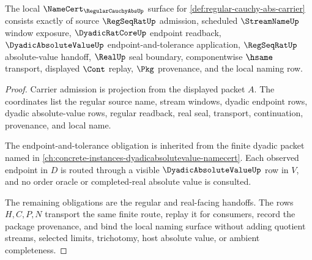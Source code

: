 \begin{theorem}
\label{thm:regular-cauchy-abs-namecert-obligations}
The local $\NameCert_{\RegularCauchyAbsUp}$ surface for \autoref{def:regular-cauchy-abs-carrier} consists exactly of source $\RegSeqRatUp$ admission, scheduled $\StreamNameUp$ window exposure, $\DyadicRatCoreUp$ endpoint readback, $\DyadicAbsoluteValueUp$ endpoint-and-tolerance application, $\RegSeqRatUp$ absolute-value handoff, $\RealUp$ seal boundary, componentwise $\hsame$ transport, displayed $\Cont$ replay, $\Pkg$ provenance, and the local naming row.
\end{theorem}
\begin{proof}
Carrier admission is projection from the displayed packet $A$. The coordinates list the regular source name, stream windows, dyadic endpoint rows, dyadic absolute-value rows, regular readback, real seal, transport, continuation, provenance, and local name.

The endpoint-and-tolerance obligation is inherited from the finite dyadic packet named in \autoref{ch:concrete-instances-dyadicabsolutevalue-namecert}. Each observed endpoint in $D$ is routed through a visible $\DyadicAbsoluteValueUp$ row in $V$, and no order oracle or completed-real absolute value is consulted.

The remaining obligations are the regular and real-facing handoffs. The rows $H,C,P,N$ transport the same finite route, replay it for consumers, record the package provenance, and bind the local naming surface without adding quotient streams, selected limits, trichotomy, host absolute value, or ambient completeness.
\end{proof}

